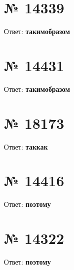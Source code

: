 \documentclass[11pt]{article} %
\begin{document}
\section{№ \textbf{14339}}

Ответ: \textbf{такимобразом}

\section{№ \textbf{14431}}

Ответ: \textbf{такимобразом}

\section{№ \textbf{18173}}

Ответ: \textbf{таккак}

\section{№ \textbf{14416}}

Ответ: \textbf{поэтому}

\section{№ \textbf{14322}}

Ответ: \textbf{поэтому}
\end{document}
